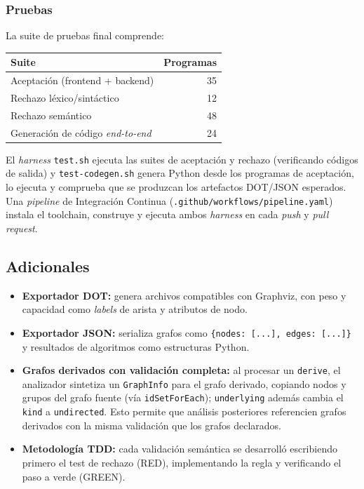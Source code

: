 \documentclass[11pt,a4paper]{article}
\newcommand{\code}[1]{\texttt{#1}}
\begin{document}
\subsubsection{Pruebas}

La suite de pruebas final comprende:

\begin{center}
\begin{tabular}{@{}lr@{}}
\toprule
\textbf{Suite} & \textbf{Programas} \\
\midrule
Aceptación (frontend + backend)         & 35 \\
Rechazo léxico/sintáctico               & 12 \\
Rechazo semántico                       & 48 \\
Generación de código \emph{end-to-end}  & 24 \\
\bottomrule
\end{tabular}
\end{center}

El \emph{harness} \code{test.sh} ejecuta las suites de aceptación y rechazo
(verificando códigos de salida) y \code{test-codegen.sh} genera Python desde los
programas de aceptación, lo ejecuta y comprueba que se produzcan los artefactos
DOT/JSON esperados. Una \emph{pipeline} de Integración Continua
(\code{.github/workflows/pipeline.yaml}) instala el toolchain, construye y
ejecuta ambos \emph{harness} en cada \emph{push} y \emph{pull request}.

\subsection{Adicionales}

\begin{itemize}[noitemsep]
  \item \textbf{Exportador DOT:} genera archivos compatibles con Graphviz, con
        peso y capacidad como \emph{labels} de arista y atributos de nodo.
  \item \textbf{Exportador JSON:} serializa grafos como
        \code{\{nodes: [...], edges: [...]\}} y resultados de algoritmos como
        estructuras Python.
  \item \textbf{Grafos derivados con validación completa:} al procesar un
        \code{derive}, el analizador sintetiza un \code{GraphInfo} para el grafo
        derivado, copiando nodos y grupos del grafo fuente (vía
        \code{idSetForEach}); \code{underlying} además cambia el \code{kind} a
        \code{undirected}. Esto permite que análisis posteriores referencien
        grafos derivados con la misma validación que los grafos declarados.
  \item \textbf{Metodología TDD:} cada validación semántica se desarrolló
        escribiendo primero el test de rechazo (RED), implementando la regla y
        verificando el paso a verde (GREEN).
\end{itemize}
\end{document}
